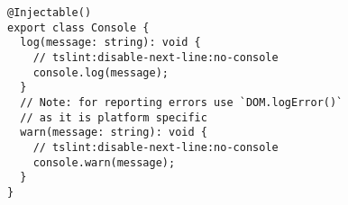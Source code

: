 \begin{verbatim}
@Injectable()
export class Console {
  log(message: string): void {
    // tslint:disable-next-line:no-console
    console.log(message);
  }
  // Note: for reporting errors use `DOM.logError()`
  // as it is platform specific
  warn(message: string): void {
    // tslint:disable-next-line:no-console
    console.warn(message);
  }
}
\end{verbatim}
